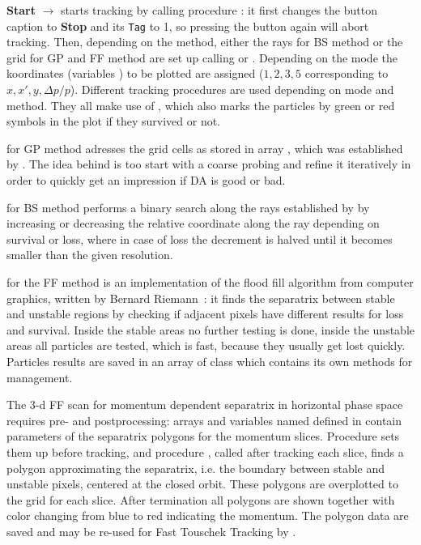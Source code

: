 \documentclass[12pt]{article}
\newcommand\code[1]{{\tt #1}}
\newcommand{\ofld}[1]{\colorbox{black!15}{{\bf #1}}}
\newcommand\guico[1]{{\color{blue}\code{#1}}}
\newcommand{\unico}[1]{{\color{burntorange}\code{#1}}}
\newcommand{\evcod}[2]{\ofld{#1} $\rightarrow$ \guico{#2}}
\newcommand{\opagui}[1]{\colorbox{blue!20}{{\color{black}\code{#1}}}}
\newcommand{\ogui}[1]{\hyperref[#1]{\opagui{#1}}}
\newcommand{\opauni}[1]{\colorbox{orange!30}{{\color{black}\code{#1}}}}
\newcommand{\ouni}[1]{\hyperref[#1]{\opauni{#1}}}
\newcommand{\feature}[1]{{\color{cadmiumgreen} #1}}
\begin{document}
\evcod{Start}{butStartClick} starts tracking by calling procedure \guico{DATracking}: it first changes the button caption to \ofld{Stop} and its \code{Tag} to 1, so pressing the button again will abort tracking. Then, depending on the method, either the rays for BS method or the grid for GP and FF method are set up calling \guico{DARaySetup} or \guico{DAGridSetup}. Depending on the mode the koordinates (variables \guico{ko...}) to be plotted are assigned ($1,2,3,5$ corresponding to $x,x',y,\Delta p/p$).  Different tracking procedures are used depending on mode and method. They all make use of \unico{DASingleTracking}, which also marks the particles by green or red symbols in the plot if they survived or not.

\guico{DATrackingClassicGrid} for GP method adresses the grid cells as stored in array \guico{dagord}, which was established by \guico{DAGridSetup}. \feature{The idea behind is too start with a coarse probing and refine it iteratively in order to quickly get an impression if DA is good or bad.} 

\guico{DATrackingBinRays} for BS method performs a binary search along the rays established by \guico{DARaySetup} by increasing or decreasing the relative coordinate along the ray depending on survival or loss, where in case of loss the decrement is halved until it becomes smaller than the given resolution. 

\guico{DATrackingFillToolGrid} for the FF method is an implementation of the flood fill algorithm from computer graphics, written by Bernard Riemann~\cite{FTTpaper}: it finds the separatrix between stable and unstable regions by checking if adjacent pixels have different results for loss and survival. Inside the stable areas no further testing is done, inside the unstable areas all particles are tested, which is fast, because they usually get lost quickly. Particles results are saved in an array \guico{queue} of class \guico{TIndexQueue} which contains its own methods for management.

The 3-d FF scan for momentum dependent separatrix in horizontal phase space requires pre- and postprocessing: arrays and variables named \unico{Flo...} defined in \ouni{tracklib} contain parameters of the separatrix polygons for the momentum slices. Procedure \guico{FloPinit} sets them up before tracking, and procedure \guico{FloPoly}, called after tracking each slice, finds a polygon approximating the separatrix, i.e. the boundary between stable and unstable pixels, centered at the closed orbit. These polygons are overplotted to the grid for each slice. After termination all polygons are shown together with color changing from blue to red indicating the momentum. The polygon data are saved and may be re-used for Fast Touschek Tracking by \ogui{opatracktt}.
\end{document}
